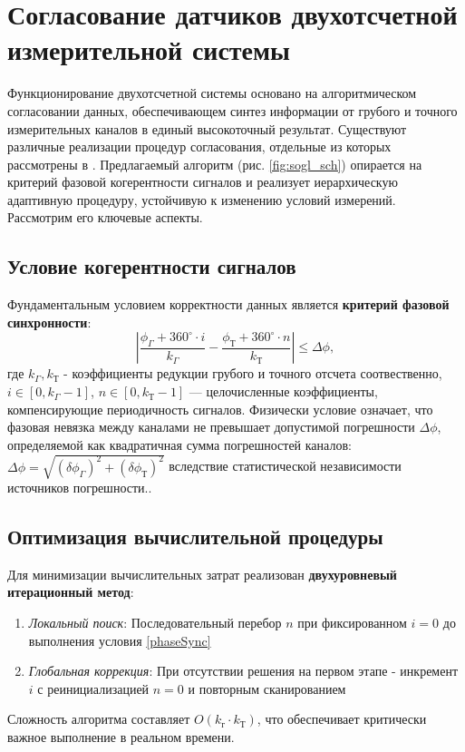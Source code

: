 \section{Согласование датчиков двухотсчетной измерительной системы}
Функционирование двухотсчетной системы основано на алгоритмическом согласовании данных, обеспечивающем синтез информации 
от грубого и точного измерительных каналов в единый высокоточный результат. Существуют различные реализации процедур согласования, 
отдельные из которых рассмотрены в \cite{Sogl}. Предлагаемый алгоритм (рис. \ref{fig:sogl_sch}) опирается на критерий фазовой когерентности сигналов 
и реализует иерархическую адаптивную процедуру, устойчивую к изменению условий измерений. Рассмотрим его ключевые аспекты.


\subsection{Условие когерентности сигналов}
Фундаментальным условием корректности данных является \textbf{критерий фазовой синхронности}:
\begin{equation}
    \left| \frac{\phi_{\Gamma} + 360^{\circ} \cdot i}{k_{\Gamma}} - \frac{\phi_{\text{Т}} + 360^{\circ} \cdot n}{k_{\text{Т}}} \right| \leq \Delta\phi,
    \label{phaseSync}
\end{equation}
где $k_{\Gamma}, k_{\text{Т}}$ - коэффициенты редукции грубого и точного отсчета соотвественно,$ i \in [0, k_{\Gamma}-1]$, $n \in [0, k_{\text{Т}}-1]$ — целочисленные 
коэффициенты, компенсирующие периодичность сигналов.
 Физически условие означает, что фазовая невязка между каналами не превышает допустимой погрешности $\Delta\phi$, определяемой как квадратичная сумма 
 погрешностей каналов:  $\Delta\phi = \sqrt{(\delta\phi_{\Gamma})^2 + (\delta\phi_{\text{Т}})^2}$ вследствие статистической независимости источников погрешности..

\subsection{Оптимизация вычислительной процедуры}
Для минимизации вычислительных затрат реализован \textbf{двухуровневый итерационный метод}:
\begin{enumerate}
    \item \textit{Локальный поиск}: Последовательный перебор $n$ при фиксированном $i=0$ до выполнения условия \ref{phaseSync} 
    \item \textit{Глобальная коррекция}: При отсутствии решения на первом этапе - инкремент $i$ с реинициализацией $n=0$ и повторным сканированием
\end{enumerate}
Сложность алгоритма составляет $O(k_{\text{г}} \cdot k_{\text{Т}})$, что обеспечивает критически важное выполнение в реальном времени.

